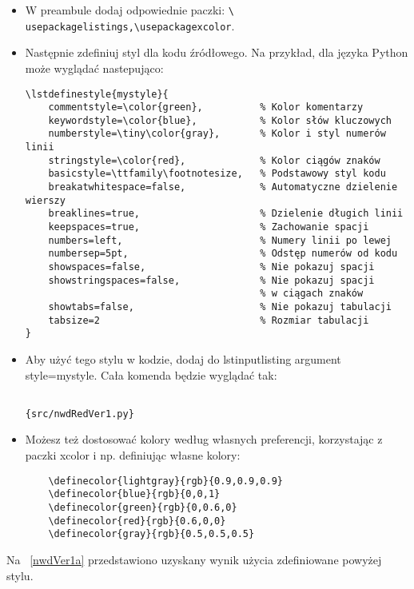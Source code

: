 \begin{itemize}
    \item W preambule dodaj odpowiednie paczki: \texttt{\textbackslash
              usepackage{listings},\textbackslash usepackage{xcolor}}.
    \item Następnie zdefiniuj styl dla kodu źródłowego. Na przykład, dla języka Python może wyglądać nastepująco:
          \small \begin{verbatim}
\lstdefinestyle{mystyle}{
    commentstyle=\color{green},          % Kolor komentarzy
    keywordstyle=\color{blue},           % Kolor słów kluczowych
    numberstyle=\tiny\color{gray},       % Kolor i styl numerów linii
    stringstyle=\color{red},             % Kolor ciągów znaków
    basicstyle=\ttfamily\footnotesize,   % Podstawowy styl kodu
    breakatwhitespace=false,             % Automatyczne dzielenie wierszy
    breaklines=true,                     % Dzielenie długich linii
    keepspaces=true,                     % Zachowanie spacji
    numbers=left,                        % Numery linii po lewej
    numbersep=5pt,                       % Odstęp numerów od kodu
    showspaces=false,                    % Nie pokazuj spacji
    showstringspaces=false,              % Nie pokazuj spacji 
                                         % w ciągach znaków
    showtabs=false,                      % Nie pokazuj tabulacji
    tabsize=2                            % Rozmiar tabulacji
}
    \end{verbatim}

    \item Aby użyć tego stylu w kodzie, dodaj do lstinputlisting argument style=mystyle. Cała komenda będzie wyglądać tak:
          \begin{verbatim}

{src/nwdRedVer1.py}
    \end{verbatim}
    \item Możesz też dostosować kolory według własnych preferencji, korzystając z paczki xcolor i np. definiując własne kolory:
          \begin{verbatim}
    \definecolor{lightgray}{rgb}{0.9,0.9,0.9}
    \definecolor{blue}{rgb}{0,0,1}
    \definecolor{green}{rgb}{0,0.6,0}
    \definecolor{red}{rgb}{0.6,0,0}
    \definecolor{gray}{rgb}{0.5,0.5,0.5}
    \end{verbatim}
\end{itemize}


Na \listingname~\ref{nwdVer1a} przedstawiono uzyskany wynik użycia zdefiniowane powyżej stylu.


